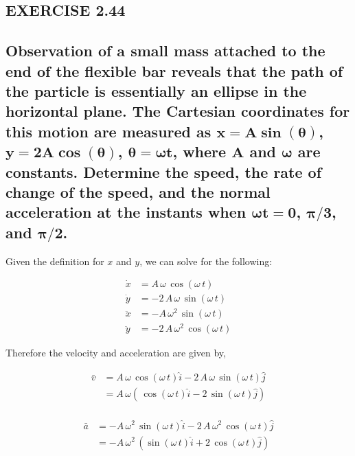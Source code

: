 \documentclass[12pt, letterpaper]{../assignment}
\begin{document}
\subsection*{EXERCISE 2.44}

\subsection*{Observation of a small mass attached to the end of the flexible bar reveals that the path of the particle is essentially an ellipse in the horizontal plane.
The Cartesian coordinates for this motion are measured as $\bm{x = A \sin (\theta)}$, $\bm{y = 2A \cos (\theta)}$, $\bm{\theta = \omega t}$,
where $\bm{A}$ and $\bm{\omega}$ are constants.
Determine the speed, the rate of change of the speed,
and the normal acceleration at the instants when $\bm{\omega t = 0}$, $\bm{\pi/3}$, and $\bm{\pi/2}$.}

Given the definition for $x$ and $y$, we can solve for the following:

\begin{equation*}
   \begin{aligned}
       \dot{x} &= A\,\omega \,\cos\left(\omega \,t\right)\\
       \dot{y} &= -2\,A\,\omega \,\sin\left(\omega \,t\right)\\
       \ddot{x} &= -A\,\omega ^2\,\sin\left(\omega \,t\right)\\
       \ddot{y} &= -2\,A\,\omega ^2\,\cos\left(\omega \,t\right)
   \end{aligned}
\end{equation*}

Therefore the velocity and acceleration are given by,

\begin{equation*}
   \begin{aligned}
       \bar{v} &= A\,\omega \,\cos\left(\omega \,t\right)\hat{i}-2\,A\,\omega \,\sin\left(\omega \,t\right)\hat{j}\\
       &= A\,\omega\left( \,\cos\left(\omega \,t\right)\hat{i}-2 \,\sin\left(\omega \,t\right)\hat{j}\right)\\
   \end{aligned}
\end{equation*}

\begin{equation*}
   \begin{aligned}
       \bar{a} &= -A\,\omega ^2\,\sin\left(\omega \,t\right)\hat{i} -2\,A\,\omega ^2\,\cos\left(\omega \,t\right)\hat{j}\\
       &= -A\,\omega ^2\,\left(\sin\left(\omega \,t\right)\hat{i}+2\,\cos\left(\omega \,t\right)\hat{j}\right)
   \end{aligned}
\end{equation*}
\end{document}
